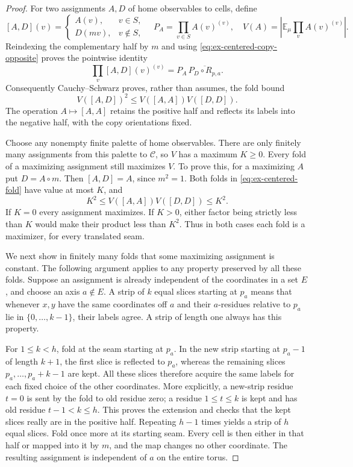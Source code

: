 \begin{proof}
For two assignments $A,D$ of home observables to cells, define
\[
 [A,D](v)=\begin{cases}A(v),&v\in S,\\D(mv),&v\notin S,\end{cases}
 \quad P_A=\prod_{v\in S}A(v)^{(v)},\quad
 V(A)=\left|\mathbb E_\mu\prod_v A(v)^{(v)}\right|.
\]
Reindexing the complementary half by $m$ and using
\eqref{eq:ex-centered-copy-opposite} proves the pointwise identity
\[
 \prod_v[A,D](v)^{(v)}=P_A\,\overline{P_D\circ R_{p,a}}.
\]
Consequently Cauchy--Schwarz proves, rather than assumes, the fold bound
\begin{equation}\label{eq:ex-centered-fold}
                 V([A,D])^2\le V([A,A])V([D,D]).
\end{equation}
The operation $A\mapsto[A,A]$ retains the positive half and reflects
its labels into the negative half, with the copy orientations fixed.

Choose any nonempty finite palette of home observables. There are only
finitely many assignments from this palette to $\mathcal C$, so $V$
has a maximum $K\ge0$. Every fold of a maximizing assignment still
maximizes $V$. To prove this, for a maximizing $A$ put $D=A\circ m$.
Then $[A,D]=A$, since $m^2=1$. Both folds in
\eqref{eq:ex-centered-fold} have value at most $K$, and
\[
                    K^2\le V([A,A])V([D,D])\le K^2.
\]
If $K=0$ every assignment maximizes. If $K>0$, either factor being
strictly less than $K$ would make their product less than $K^2$.
Thus in both cases each fold is a maximizer, for every translated seam.

We next show in finitely many folds that some maximizing assignment is
constant. The following argument applies to any property preserved by
all these folds. Suppose an assignment is already independent of the
coordinates in a set $E$, and choose an axis $a\notin E$.
A strip of $k$ equal slices starting at $p_a$ means that whenever
$x,y$ have the same coordinates off $a$ and their $a$-residues
relative to $p_a$ lie in $\{0,\ldots,k-1\}$, their labels agree.
A strip of length one always has this property.

For $1\le k<h$, fold at the seam starting at $p_a$. In the new strip
starting at $p_a-1$ of length $k+1$, the first slice is reflected to
$p_a$, whereas the remaining slices $p_a,\ldots,p_a+k-1$ are kept.
All these slices therefore acquire the same labels for each fixed
choice of the other coordinates. More explicitly, a new-strip residue
$t=0$ is sent by the fold to old residue zero; a residue
$1\le t\le k$ is kept and has old residue $t-1<k\le h$.
This proves the extension and checks that the kept slices really are
in the positive half. Repeating $h-1$ times yields a strip of $h$
equal slices. Fold once more at its starting seam. Every cell is then
either in that half or mapped into it by $m$, and the map changes no
other coordinate. The resulting assignment is independent of $a$
on the entire torus.


\end{proof}
